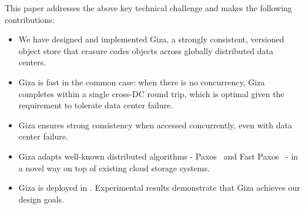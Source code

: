 This paper addresses the above key technical challenge and makes the following contributions:
\begin{itemize}
    \item We have designed and implemented Giza, a strongly consistent,
      versioned object store that erasure codes objects across globally
      distributed data centers.
    \item Giza is fast in the common case: when there is no concurrency, Giza
      completes within a single cross-DC round trip, which is optimal given the
      requirement to tolerate data center failure.
    \item Giza ensures strong consistency when accessed concurrently, even with data center
      failure.
    \item Giza adapts well-known distributed algorithms - Paxos~\cite{lamport01paxos}
      and Fast Paxos~\cite{lamport05fast} - in a novel way on top of existing cloud storage systems.
    \item Giza is deployed in \deployment. Experimental results demonstrate
      that Giza achieves our design goals. %
\end{itemize}
